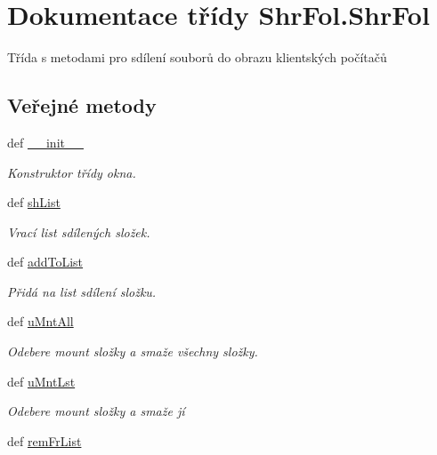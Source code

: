 \hypertarget{classShrFol_1_1ShrFol}{\section{Dokumentace třídy Shr\-Fol.\-Shr\-Fol}
\label{d1/dce/classShrFol_1_1ShrFol}
}


Třída s metodami pro sdílení souborů do obrazu klientských počítačů  


\subsection*{Veřejné metody}
\begin{DoxyCompactItemize}
\item 
def \hyperlink{classShrFol_1_1ShrFol_aab76b87908cebac7e15bed64b47ebf73}{\-\_\-\-\_\-init\-\_\-\-\_\-}
\begin{DoxyCompactList}\small\item\em Konstruktor třídy okna. \end{DoxyCompactList}\item 
def \hyperlink{classShrFol_1_1ShrFol_a9c6d9419ead704adaa83dd00209f7d8d}{sh\-List}
\begin{DoxyCompactList}\small\item\em Vrací list sdílených složek. \end{DoxyCompactList}\item 
def \hyperlink{classShrFol_1_1ShrFol_a9f817cf66c0e30b0f6f7fe8dc56ca7da}{add\-To\-List}
\begin{DoxyCompactList}\small\item\em Přidá na list sdílení složku. \end{DoxyCompactList}\item 
def \hyperlink{classShrFol_1_1ShrFol_a83073341f2ff8ba2cc2f0ec3d28f0bfe}{u\-Mnt\-All}
\begin{DoxyCompactList}\small\item\em Odebere mount složky a smaže všechny složky. \end{DoxyCompactList}\item 
def \hyperlink{classShrFol_1_1ShrFol_a09764ae9bb636491c06f49b382d96632}{u\-Mnt\-Lst}
\begin{DoxyCompactList}\small\item\em Odebere mount složky a smaže jí \end{DoxyCompactList}\item 
def \hyperlink{classShrFol_1_1ShrFol_a73b990abe1e0a91da9f90fda31c686b7}{rem\-Fr\-List}

\end{DoxyCompactItemize}
